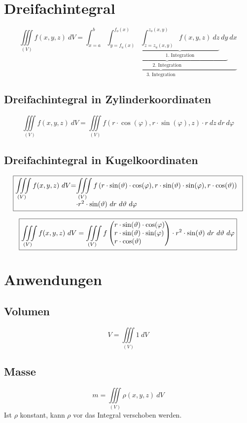 \section{Dreifachintegral}
\[ \boxed{\iiint\limits_{(V)} f(x,y,z) ~ dV 
= \underbrace{\int_{x=a}^{b} 
\underbrace{\int_{y=f_u(x)}^{f_o(x)} 
\underbrace{\int_{z=z_u(x,y)}^{z_o(x,y)} f(x,y,z) ~ dz}
_{\text{1. Integration}} ~ dy}
_{\text{2. Integration}} ~ dx}
_{\text{3. Integration}}} \]

\subsection{Dreifachintegral in Zylinderkoordinaten}
\[ \boxed{\iiint\limits_{(V)} f(x,y,z) ~ dV 
= \iiint\limits_{(V)} f(r \cdot \cos(\varphi),r \cdot \sin(\varphi), z) 
\cdot r ~ dz ~ dr ~ d\varphi} \]

\subsection{Dreifachintegral in Kugelkoordinaten}
\[ \boxed{\begin{array}{@{}l@{}l@{}l}
\displaystyle\iiint\limits_{(V)} f(x,y,z) ~ dV 
&=& \displaystyle\iiint\limits_{(V)} f\left(r \cdot \sin(\vartheta) \cdot \cos(\varphi), 
r \cdot \sin(\vartheta) \cdot \sin(\varphi), r \cdot \cos(\vartheta)\right) \\
&&\cdot r^2 \cdot \sin(\vartheta) ~ dr ~ d\vartheta ~ d\varphi
\end{array}} \]

\[ \boxed{\iiint\limits_{(V)} f(x,y,z) ~ dV = \iiint\limits_{(V)} 
f\left(\begin{array}{@{}l@{}}r \cdot \sin(\vartheta) \cdot \cos(\varphi) \\
r \cdot \sin(\vartheta) \cdot \sin(\varphi) \\ 
r \cdot \cos(\vartheta)\end{array}\right) 
\cdot r^2 \cdot \sin(\vartheta) ~ dr ~ d\vartheta ~ d\varphi} \]

\section{Anwendungen}

\subsection{Volumen}
\[ \boxed{V = \iiint\limits_{(V)} 1 ~ dV} \]

\subsection{Masse}
\[ \boxed{m = \iiint\limits_{(V)} \rho(x,y,z) ~ dV} \]
Ist $\rho$ konstant, kann $\rho$ vor das Integral verschoben werden. 


